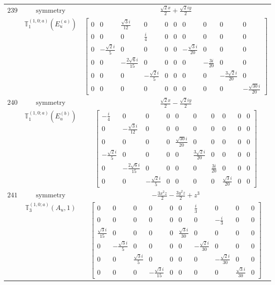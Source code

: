 \documentclass[fleqn,8pt,landscape]{jsarticle}
\begin{document}
\begin{longtable}{ccc}
$ 239 $ & $ \text{symmetry} $ & $ \frac{\sqrt{2} x}{2} + \frac{\sqrt{2} i y}{2} $ \\
$  $ & $ \mathbb{T}_{1}^{(1,0;a)}(E_{u}^{(a)}) $ & $ \begin{bmatrix} 0 & 0 & \frac{\sqrt{3} i}{12} & 0 & 0 & 0 & 0 & 0 & 0 & 0 \\ 0 & 0 & 0 & \frac{i}{4} & 0 & 0 & 0 & 0 & 0 & 0 \\ 0 & - \frac{\sqrt{2} i}{5} & 0 & 0 & 0 & 0 & - \frac{\sqrt{3} i}{20} & 0 & 0 & 0 \\ 0 & 0 & - \frac{2 \sqrt{6} i}{15} & 0 & 0 & 0 & 0 & - \frac{3 i}{20} & 0 & 0 \\ 0 & 0 & 0 & - \frac{\sqrt{2} i}{5} & 0 & 0 & 0 & 0 & - \frac{3 \sqrt{2} i}{20} & 0 \\ 0 & 0 & 0 & 0 & 0 & 0 & 0 & 0 & 0 & - \frac{\sqrt{30} i}{20} \end{bmatrix} $ \\ \hline
$ 240 $ & $ \text{symmetry} $ & $ \frac{\sqrt{2} x}{2} - \frac{\sqrt{2} i y}{2} $ \\
$  $ & $ \mathbb{T}_{1}^{(1,0;a)}(E_{u}^{(b)}) $ & $ \begin{bmatrix} - \frac{i}{4} & 0 & 0 & 0 & 0 & 0 & 0 & 0 & 0 & 0 \\ 0 & - \frac{\sqrt{3} i}{12} & 0 & 0 & 0 & 0 & 0 & 0 & 0 & 0 \\ 0 & 0 & 0 & 0 & \frac{\sqrt{30} i}{20} & 0 & 0 & 0 & 0 & 0 \\ - \frac{\sqrt{2} i}{5} & 0 & 0 & 0 & 0 & \frac{3 \sqrt{2} i}{20} & 0 & 0 & 0 & 0 \\ 0 & - \frac{2 \sqrt{6} i}{15} & 0 & 0 & 0 & 0 & \frac{3 i}{20} & 0 & 0 & 0 \\ 0 & 0 & - \frac{\sqrt{2} i}{5} & 0 & 0 & 0 & 0 & \frac{\sqrt{3} i}{20} & 0 & 0 \end{bmatrix} $ \\ \hline
$ 241 $ & $ \text{symmetry} $ & $ - \frac{3 x^{2} z}{2} - \frac{3 y^{2} z}{2} + z^{3} $ \\
$  $ & $ \mathbb{T}_{3}^{(1,0;a)}(A_{u},1) $ & $ \begin{bmatrix} 0 & 0 & 0 & 0 & 0 & 0 & \frac{i}{3} & 0 & 0 & 0 \\ 0 & 0 & 0 & 0 & 0 & 0 & 0 & - \frac{i}{3} & 0 & 0 \\ \frac{\sqrt{3} i}{15} & 0 & 0 & 0 & 0 & \frac{\sqrt{3} i}{30} & 0 & 0 & 0 & 0 \\ 0 & - \frac{\sqrt{3} i}{5} & 0 & 0 & 0 & 0 & - \frac{\sqrt{2} i}{30} & 0 & 0 & 0 \\ 0 & 0 & \frac{\sqrt{3} i}{5} & 0 & 0 & 0 & 0 & - \frac{\sqrt{2} i}{30} & 0 & 0 \\ 0 & 0 & 0 & - \frac{\sqrt{3} i}{15} & 0 & 0 & 0 & 0 & \frac{\sqrt{3} i}{30} & 0 \end{bmatrix} $ \\ \hline

\end{longtable}
\end{document}
